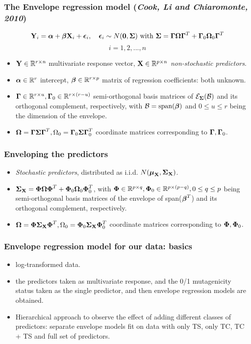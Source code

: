 \documentclass[handout,10pt]{beamer}
\begin{document}
\begin{frame}
\frametitle{The Envelope regression model (\textit{Cook, Li and Chiaromonte, 2010})}
$$ {\mathbf{Y}}_i = {\boldsymbol{\alpha}} + {\boldsymbol{\beta}}{\mathbf{X}}_i + {\boldsymbol{\epsilon}}_i,\quad {\boldsymbol{\epsilon}}_i\sim N({\mathbf{0}},{\boldsymbol{\Sigma}}) \mbox{ with }{\boldsymbol{\Sigma}} = {\boldsymbol{\Gamma}}{\boldsymbol{\Omega}}{\boldsymbol{\Gamma}}^T + {\boldsymbol{\Gamma}}_0{\boldsymbol{\Omega}}_0{\boldsymbol{\Gamma}}^T$$
$$ i = 1,2,...,n $$
\begin{itemize}
\item ${\mathbf{Y}}\in{\mathbb{R}}^{r\times n}$ multivariate response vector, ${\mathbf{X}}\in{\mathbb{R}}^{p\times n}$ \textit{non-stochastic predictors}.
\item ${\boldsymbol{\alpha}}\in{\mathbb{R}}^r$ intercept, ${\boldsymbol{\beta}}\in{\mathbb{R}}^{r\times p}$ matrix of regression coefficients: both unknown.
\item ${\boldsymbol{\Gamma}}\in{\mathbb{R}}^{r\times u},{\boldsymbol{\Gamma}}_0\in{\mathbb{R}}^{r\times (r-u)}$ semi-orthogonal basis matrices of ${\cal{E}}_{\boldsymbol{\Sigma}}({\cal{B}})$ and its orthogonal complement, respectively, with ${\cal{B}} = \mbox{span}({\boldsymbol{\beta}})$ and $0\leq u\leq r$ being the dimension of the envelope.
\item ${\boldsymbol{\Omega}} = {\boldsymbol{\Gamma}}{\boldsymbol{\Sigma}}{\boldsymbol{\Gamma}}^T, \Omega_0 = {\boldsymbol{\Gamma}}_0{\boldsymbol{\Sigma}}{\boldsymbol{\Gamma}}_0^T$ coordinate matrices corresponding to ${\boldsymbol{\Gamma}}, {\boldsymbol{\Gamma}}_0$.
\end{itemize}
\end{frame}

\begin{frame}
\frametitle{Enveloping the predictors}
\begin{itemize}
\item \textit{Stochastic predictors}, distributed as i.i.d. $N({\boldsymbol{\mu}}_{\mathbf{X}},{\boldsymbol{\Sigma}}_{\mathbf{X}})$.
\vspace{.2cm}
\item ${\boldsymbol{\Sigma}}_{\mathbf{X}} = {\boldsymbol{\Phi}}{\boldsymbol{\Omega}}{\boldsymbol{\Phi}}^T + {\boldsymbol{\Phi}}_0{\boldsymbol{\Omega}}_0{\boldsymbol{\Phi}}_0^T$, with ${\boldsymbol{\Phi}}\in{\mathbb{R}}^{p\times q}, {\boldsymbol{\Phi}}_0\in{\mathbb{R}}^{p\times(p-q)}, 0\leq q\leq p$ being semi-orthogonal basis matrices of the envelope of span(${\boldsymbol{\beta}}^T$) and its orthogonal complement, respectively.
\vspace{.2cm}
\item ${\boldsymbol{\Omega}} = {\boldsymbol{\Phi}}{\boldsymbol{\Sigma}}_{\mathbf{X}}{\boldsymbol{\Phi}}^T, \Omega_0 = {\boldsymbol{\Phi}}_0{\boldsymbol{\Sigma}}_{\mathbf{X}}{\boldsymbol{\Phi}}_0^T$ coordinate matrices corresponding to ${\boldsymbol{\Phi}}, {\boldsymbol{\Phi}}_0$.
\end{itemize}
\end{frame}

\begin{frame}
\frametitle{Envelope regression model for our data: basics}
\begin{itemize}
\item log-transformed data.
\vspace{.2cm}
\item the predictors taken as multivariate response, and the 0/1 mutagenicity status taken as the single predictor, and then envelope regression models are obtained.
\vspace{.2cm}
\item Hierarchical approach to observe the effect of adding different classes of predictors: separate envelope models fit on data with only TS, only TC, TC + TS and full set of predictors.
\end{itemize}
\end{frame}
\end{document}

